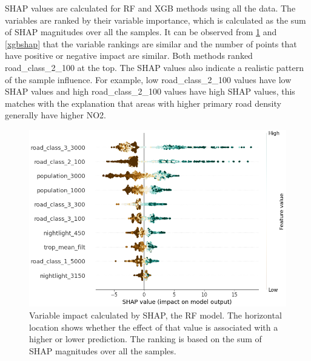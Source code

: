 \documentclass{article}
\begin{document}
SHAP values are calculated for RF and XGB methods using all the data. The variables are ranked by their variable importance, which is calculated as the sum of SHAP magnitudes over all the samples. It can be observed from \cref{rfshap} and \cref{xgbshap} that the variable rankings are similar and the number of points that have positive or negative impact are similar. Both methods ranked road\_class\_2\_100 at the top. The SHAP values also indicate a realistic pattern of the sample influence. For example, low  road\_class\_2\_100 values have low SHAP values and high road\_class\_2\_100 values have high SHAP values, this matches with the explanation that areas with higher primary road density generally have higher NO2.

\begin{figure}
\centering
\includegraphics[scale = 0.5]{fig/rfshap.png}
\caption{Variable impact calculated by SHAP, the RF model. The horizontal location shows whether the effect of that value is associated with a higher or lower prediction. The ranking is based on the sum of SHAP magnitudes over all the samples.}
\label{rfshap}
\end{figure}
\end{document}
